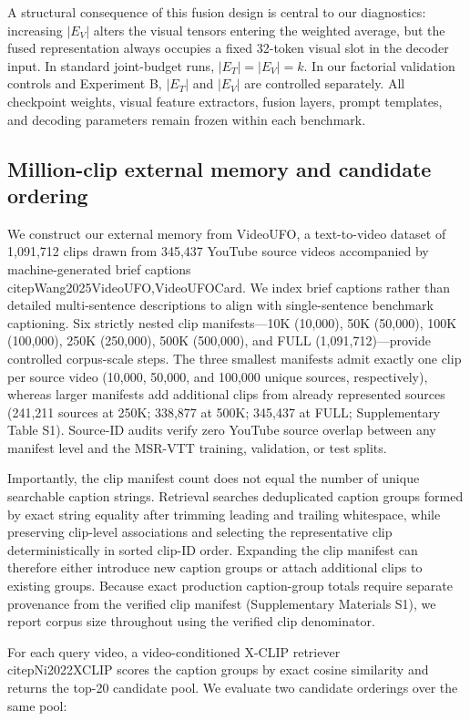 \documentclass[11pt,a4paper]{article}
\begin{document}
A structural consequence of this fusion design is central to our diagnostics: increasing $|E_V|$ alters the visual tensors entering the weighted average, but the fused representation always occupies a fixed 32-token visual slot in the decoder input. In standard joint-budget runs, $|E_T| = |E_V| = k$. In our factorial validation controls and Experiment B, $|E_T|$ and $|E_V|$ are controlled separately. All checkpoint weights, visual feature extractors, fusion layers, prompt templates, and decoding parameters remain frozen within each benchmark.

\subsection{Million-clip external memory and candidate ordering}
We construct our external memory from VideoUFO, a text-to-video dataset of 1,091,712 clips drawn from 345,437 YouTube source videos accompanied by machine-generated brief captions \\citep{Wang2025VideoUFO,VideoUFOCard}. We index brief captions rather than detailed multi-sentence descriptions to align with single-sentence benchmark captioning. Six strictly nested clip manifests---10K (10,000), 50K (50,000), 100K (100,000), 250K (250,000), 500K (500,000), and FULL (1,091,712)---provide controlled corpus-scale steps. The three smallest manifests admit exactly one clip per source video (10,000, 50,000, and 100,000 unique sources, respectively), whereas larger manifests add additional clips from already represented sources (241,211 sources at 250K; 338,877 at 500K; 345,437 at FULL; Supplementary Table S1). Source-ID audits verify zero YouTube source overlap between any manifest level and the MSR-VTT training, validation, or test splits.

Importantly, the clip manifest count does not equal the number of unique searchable caption strings. Retrieval searches deduplicated caption groups formed by exact string equality after trimming leading and trailing whitespace, while preserving clip-level associations and selecting the representative clip deterministically in sorted clip-ID order. Expanding the clip manifest can therefore either introduce new caption groups or attach additional clips to existing groups. Because exact production caption-group totals require separate provenance from the verified clip manifest (Supplementary Materials S1), we report corpus size throughout using the verified clip denominator.

For each query video, a video-conditioned X-CLIP retriever \\citep{Ni2022XCLIP} scores the caption groups by exact cosine similarity and returns the top-20 candidate pool. We evaluate two candidate orderings over the same pool:
\end{document}
